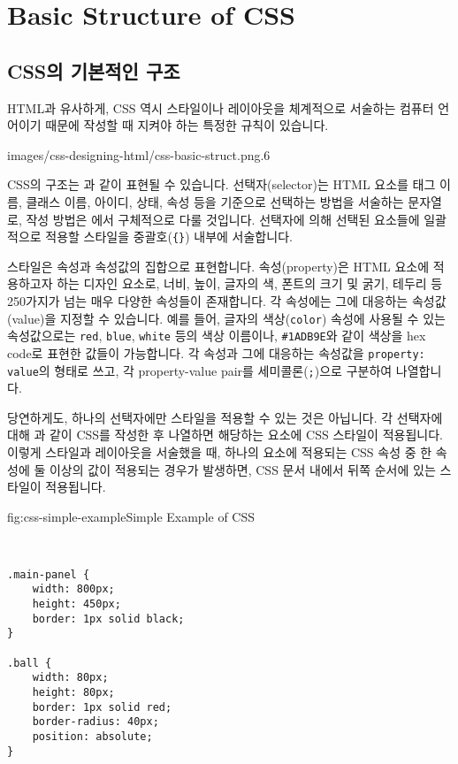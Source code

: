 \section{Basic Structure of CSS} \label{sect:basic-structure-of-css}

\subsection*{CSS의 기본적인 구조}

HTML과 유사하게, CSS 역시 스타일이나 레이아웃을 체계적으로 서술하는 컴퓨터 언어이기 때문에 작성할 때 지켜야 하는 특정한 규칙이 있습니다.

    {images/css-designing-html/css-basic-struct.png}{.6}

CSS의 구조는 과 같이 표현될 수 있습니다. 선택자(selector)는 HTML 요소를 태그 이름, 클래스 이름, 아이디, 상태, 속성 등을 기준으로 선택하는 방법을 서술하는 문자열로, 작성 방법은 에서 구체적으로 다룰 것입니다. 선택자에 의해 선택된 요소들에 일괄적으로 적용할 스타일을 중괄호(\verb|{}|) 내부에 서술합니다.

스타일은 속성과 속성값의 집합으로 표현합니다. 속성(property)은 HTML 요소에 적용하고자 하는 디자인 요소로, 너비, 높이, 글자의 색, 폰트의 크기 및 굵기, 테두리 등 250가지가 넘는 매우 다양한 속성들이 존재합니다. 각 속성에는 그에 대응하는 속성값(value)을 지정할 수 있습니다. 예를 들어, 글자의 색상(\verb|color|) 속성에 사용될 수 있는 속성값으로는 \verb|red|, \verb|blue|, \verb|white| 등의 색상 이름이나, \verb|#1ADB9E|와 같이 색상을 hex code로 표현한 값들이 가능합니다. 각 속성과 그에 대응하는 속성값을 \verb|property: value|의 형태로 쓰고, 각 property-value pair를 세미콜론(\verb|;|)으로 구분하여 나열합니다.

당연하게도, 하나의 선택자에만 스타일을 적용할 수 있는 것은 아닙니다. 각 선택자에 대해 과 같이 CSS를 작성한 후 나열하면 해당하는 요소에 CSS 스타일이 적용됩니다. 이렇게 스타일과 레이아웃을 서술했을 때, 하나의 요소에 적용되는 CSS 속성 중 한 속성에 둘 이상의 값이 적용되는 경우가 발생하면, CSS 문서 내에서 뒤쪽 순서에 있는 스타일이 적용됩니다. 

\begin{codeenv}{fig:css-simple-example}{Simple Example of CSS}\begin{verbatim}


.main-panel {
    width: 800px;
    height: 450px;
    border: 1px solid black;
}

.ball {
    width: 80px;
    height: 80px;
    border: 1px solid red;
    border-radius: 40px;
    position: absolute;
}
\end{verbatim}
\end{codeenv}

